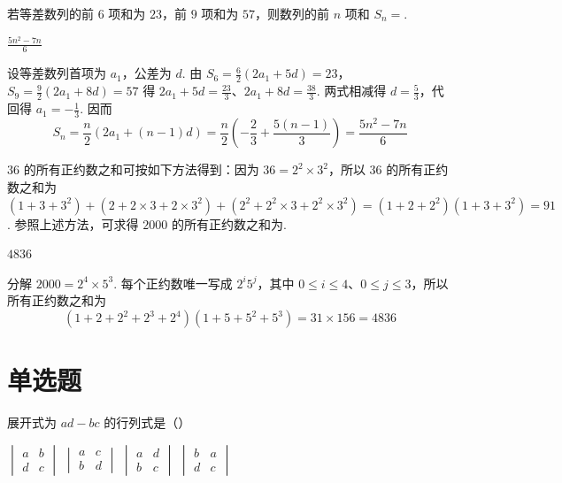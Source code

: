 \begin{problem}
若等差数列的前 \(6\) 项和为 \(23\)，前 \(9\) 项和为 \(57\)，则数列的前 \(n\) 项和 \(S_{n}=\)\fillinblank{}.
\end{problem}

\begin{answer}
\(\frac{5n^{2}-7n}{6}\)
\end{answer}

\begin{solution}
设等差数列首项为 \(a_1\)，公差为 \(d\). 由
\(S_6=\frac{6}{2}(2a_1+5d)=23\)，\(S_9=\frac{9}{2}(2a_1+8d)=57\)
得 \(2a_1+5d=\frac{23}{3}\)、\(2a_1+8d=\frac{38}{3}\). 两式相减得 \(d=\frac53\)，代回得 \(a_1=-\frac13\). 因而
\[
S_n=\frac n2\left(2a_1+(n-1)d\right)
=\frac n2\left(-\frac23+\frac{5(n-1)}3\right)
=\frac{5n^2-7n}{6}
\]
\end{solution}

\begin{problem}
\(36\) 的所有正约数之和可按如下方法得到：因为 \( 36=2^{2}\times3^{2} \)，所以 \(36\) 的所有正约数之和为 \(\displaystyle (1+3+3^{2})+(2+2\times3+2\times3^{2})+(2^{2}+2^{2}\times3+2^{2}\times3^{2})=(1+2+2^{2})(1+3+3^{2})=91\). 参照上述方法，可求得 \(2000\) 的所有正约数之和为\fillinblank{}.
\end{problem}

\begin{answer}
\(4836\)
\end{answer}

\begin{solution}
分解 \(2000=2^4\times5^3\). 每个正约数唯一写成 \(2^i5^j\)，其中 \(0\le i\le4\)、\(0\le j\le3\)，所以所有正约数之和为
\[
(1+2+2^2+2^3+2^4)(1+5+5^2+5^3)=31\times156=4836
\]
\end{solution}

\section{单选题}

\begin{problem}
展开式为 \(ad-bc\) 的行列式是（\quad）

\choices
    {\( \begin{vmatrix} a & b \\ d & c \end{vmatrix} \)}
    {\( \begin{vmatrix} a & c \\ b & d \end{vmatrix} \)}
    {\( \begin{vmatrix} a & d \\ b & c \end{vmatrix} \)}
    {\( \begin{vmatrix} b & a \\ d & c \end{vmatrix} \)}
\end{problem}

